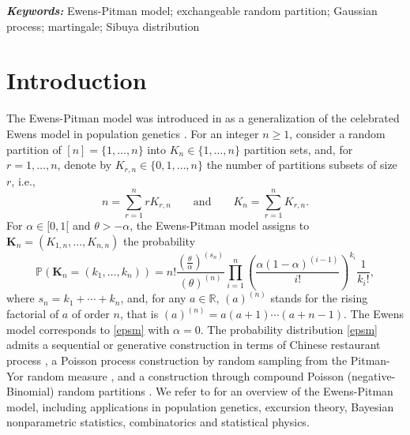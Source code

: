 \documentclass[twoside,12pt]{article}
\newcommand{\dR}{\mathbb{R}}
\providecommand{\keywords}[1]
{
  \small	
  \textbf{\textit{Keywords:}} #1
}
\begin{document}
\keywords{Ewens-Pitman model; exchangeable random partition; Gaussian process; martingale; Sibuya distribution}


\section{Introduction}

The Ewens-Pitman model was introduced in \citet{Pit(95)} as a generalization of the celebrated Ewens model in population genetics \citep{Ewe(72)}. For an integer $n\geq 1$, consider a random partition of $[n]=\{1,\ldots,n\}$ into $K_{n}\in\{1,\ldots,n\}$ partition sets, and, for $r=1,\ldots,n$, denote by $K_{r,n}\in\{0,1,\ldots,n\}$ the number of partitions subsets of size $r$, i.e.,
$$
n=\sum_{r=1}^{n}rK_{r,n}\qquad \text{and}\qquad K_{n}=\sum_{r=1}^{n}K_{r,n}.
$$ 
For $\alpha\in[0,1[$ and $\theta>-\alpha$, the Ewens-Pitman model assigns to $\mathbf{K}_{n}=(K_{1,n},\ldots,K_{n,n})$ the probability
\begin{equation}\label{epsm}
\mathbb{P}(\mathbf{K}_{n}=(k_{1},\ldots,k_{n}))=n!\frac{\left(\frac{\theta}{\alpha}\right)^{(s_n)}}{(\theta)^{(n)}}\prod_{i=1}^{n}\left(\frac{\alpha(1-\alpha)^{(i-1)}}{i!}\right)^{k_{i}}\frac{1}{k_{i}!},
\end{equation}
where $s_n=k_1+\cdots+k_n$, and, for any $a\in \dR$, $(a)^{(n)}$ stands for the rising factorial of $a$ of order $n$, that is $(a)^{(n)}=a(a+1)\cdots(a+n-1)$. The Ewens model corresponds to \eqref{epsm} with $\alpha=0$. The probability distribution \eqref{epsm} admits a sequential or generative construction in terms of Chinese restaurant process \citep{Pit(95),Fen(98)}, a Poisson process construction by random sampling from the Pitman-Yor random measure \citep{Per(92),Pit(97)}, and a construction through compound Poisson (negative-Binomial) random partitions \cite{Dol(20),Dol(21)}. We refer to \citet[Chapter 3 and Chapter 4]{Pit(06)} for an overview of the Ewens-Pitman model, including applications in population genetics, excursion theory, Bayesian nonparametric statistics, combinatorics and statistical physics.
\end{document}
